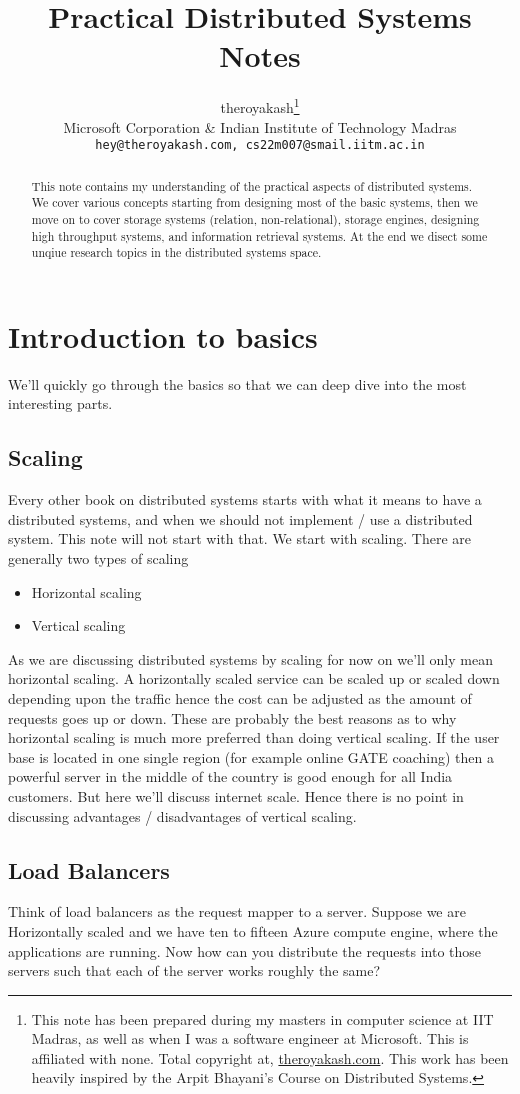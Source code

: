 \documentclass{article}
\title{Practical Distributed Systems Notes}
\author{
    theroyakash\thanks{\textsf{This note has been prepared 
    during my masters in computer science at IIT Madras, 
    as well as when I was a software engineer at Microsoft. This is affiliated with none. Total copyright at}, 
    \href{https://theroyakash.com}{\textsf{theroyakash.com}}. \textsf{This work has been heavily inspired by the Arpit Bhayani's Course on Distributed Systems.}}\\
    Microsoft Corporation\: \& Indian Institute of Technology Madras \\
    \texttt{hey@theroyakash.com, cs22m007@smail.iitm.ac.in}
}
\theoremstyle{remark}
\begin{document}
\maketitle

\begin{abstract}
    This note contains my understanding of the practical
    aspects of distributed systems. We cover various concepts
    starting from designing most of the basic systems, then we
    move on to cover storage systems (relation, non-relational),
    storage engines, designing high throughput systems, and
    information retrieval systems. At the end we disect some
    unqiue research topics in the distributed systems space.
\end{abstract}

\section{Introduction to basics}
We'll quickly go through the basics so that we can deep dive into the most
interesting parts.
\subsection{Scaling}
Every other book on distributed systems starts with what it means to have
a distributed systems, and when we should not implement / use a
distributed system. This note will not start with that. We start with scaling.
There are generally two types of scaling 

\begin{itemize}
    \item Horizontal scaling
    \item Vertical scaling 
\end{itemize}

As we are discussing distributed systems by scaling for now on we'll only
mean horizontal scaling. A horizontally scaled service can be scaled up or scaled down 
depending upon the traffic hence the cost can be adjusted as
the amount of requests goes up or down. These are probably the best reasons
as to why horizontal scaling is much more preferred than doing
vertical scaling. If the user base is located in one single region (for
example online GATE coaching) then a powerful server in the middle of
the country is good enough for all India customers. But here
we'll discuss internet scale. Hence there is no point in discussing
advantages / disadvantages of vertical scaling.

\subsection{Load Balancers}
Think of load balancers as the request mapper to a server. Suppose we are
Horizontally scaled and we have ten to fifteen Azure compute engine, where
the applications are running. Now how can you distribute the
requests into those servers such that each of the server works
roughly the same?
\end{document}
